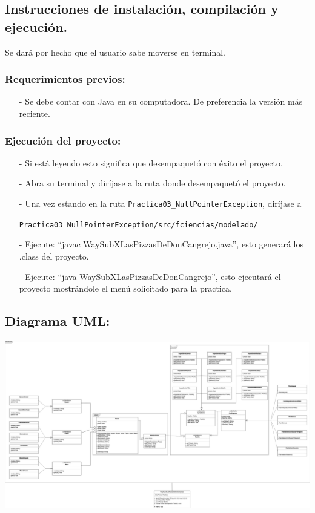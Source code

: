\documentclass{article}
\newcommand{\code}[1]{\textcolor{white!25!black}{\texttt{#1}}}
\begin{document}
\subsection*{Instrucciones de instalación, compilación y ejecución.}
Se dará por hecho que el usuario sabe moverse en terminal.\\

\subsubsection*{Requerimientos previos:}
\begin{itemize}
\item[-] Se debe contar con Java en su computadora. De preferencia la versión más reciente.
\end{itemize}

\subsubsection*{Ejecución del proyecto:}
\begin{itemize}
\item[-] Si está leyendo esto significa que desempaquetó con éxito el proyecto.
\item[-] Abra su terminal y diríjase a la ruta donde desempaquetó el proyecto.
\item[-] Una vez estando en la ruta \code{Practica03\_NullPointerException}, diríjase a

  \code{Practica03\_NullPointerException/src/fciencias/modelado/}
\item[-] Ejecute: “javac WaySubXLasPizzasDeDonCangrejo.java”, esto generará los .class del proyecto.
\item[-] Ejecute: “java WaySubXLasPizzasDeDonCangrejo”, esto ejecutará el proyecto mostrándole el menú solicitado para la practica.
\end{itemize}

\newpage
\subsection*{Diagrama UML:}
\begin{center}
  \includegraphics[scale=0.16]{./Practica03UML.png}
\end{center}
\end{document}
